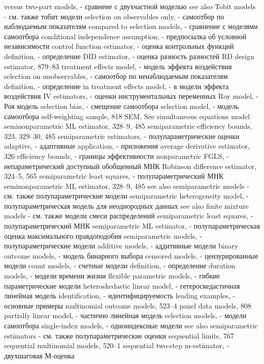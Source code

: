 versus two-part models, - сравнеие с двухчастной моделью
see also Tobit models - см. также тобит модели
selection on observables only, - самоотбор по наблюдаемым показателям
compared to selection models, - сравнение с моделями самоотбора
conditional independence assumption, - предпосылка об условной независимости
control function estimator, - оценка контрольных функций
definition, - определение
DID estimator, - оценка разность разностей
RD design estimator, 879–83
treatment effects model, - модель эффекта воздействия
selection on unobservables, - самоотбор по ненаблюдаемым показателям
definition, - определение
in treatment effects model, - в модели эффекта воздействия
IV estimators, - оценки инструментальных переменных
Roy model, - Роя модель
selection bias, - смещение самоотбора
selection model, - модель самоотбора
self-weighting sample, 818
SEM. See simultaneous equations model seminonparametric ML estimator, 328–9, 485 semiparametric efficiency bounds, 323, 329–30, 485 
semiparametric estimators, - полупараметрические оценки
adaptive, - адаптивные
application, - приложения
average derivative estimator, 326
efficiency bounds, - границы эффективности
nonparametric FGLS, - непараметрический доступный обобщенный МНК
Robinson difference estimator, 324–5, 565 
semiparametric least squares, - полупараметрический МНК
seminonparametric ML estimator, 328–9, 485 
see also semiparametric models - см. также полупараметрические модели
semiparametric heterogeneity model, - полупараметрическая модель для неоднородных данных
see also finite mixture models - см. также модели смеси распределений
semiparametric least squares, - полупараметрический МНК
semiparametric ML estimator, - полупараметрическая оценка максимального правдоподобия
semiparametric models, - полупараметрические модели
additive models, - аддитивные модели
binary outcome models, - модель бинарного выбора
censored models, - цензурированные модели
count models, - счетные модели
definition, - определение
duration models, - модели времени жизни
flexible parametric models, - гибкие параметрические модели 
heteroskedastic linear model, - гетероскедастичная линейная модель
identification, - идентифицируемость
leading examples, - основные примеры
multinomial outcome models, 523–4 panel data models, 808
partially linear model, - частично линейная модель
selection models, - модели самоотбора
single-index models, - одноиндексные модели
see also semiparametric estimators - см. также полупараметрические оценки
sequential limits, 767
sequential multinomial models, 520–1 
sequential two-step m-estimator, - двухшаговая М-оценка
